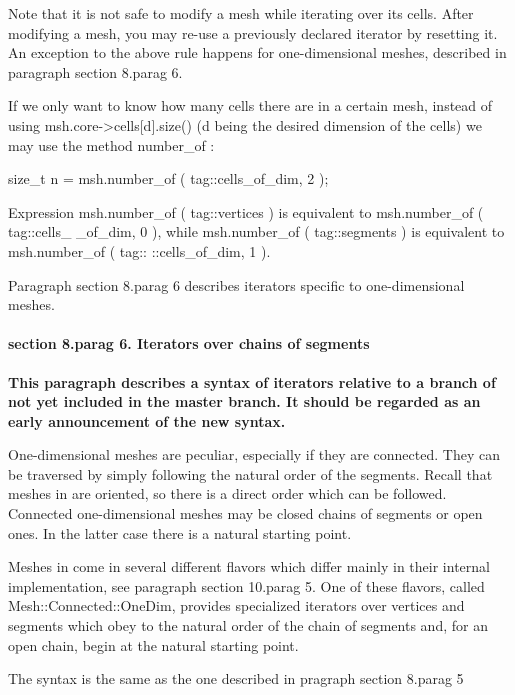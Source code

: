 Note that it is not safe to modify a mesh while iterating over its cells.
After modifying a mesh, you may re-use a previously declared iterator by {\codett reset}ting it.
An exception to the above rule happens for one-dimensional meshes, described in paragraph
\numb section 8.\numb parag 6.

If we only want to know how many cells there are in a certain mesh,
instead of using {\codett msh.core->cells[d].size()} ({\codett d} being the desired
dimension of the cells) we may use the method {\codett number\_of} :

\verbatim
   size_t n = msh.number_of ( tag::cells_of_dim, 2 );
\endverbatim

\noindent Expression {\codett msh.number\_of ( tag::vertices )} is equivalent to
{\codett msh.number\_of ( tag::cells\_ \_of\_dim, 0 )}, while {\codett msh.number\_of
( tag::segments ) } is equivalent to {\codett msh.number\_of ( tag:: ::cells\_of\_dim, 1 )}.

Paragraph \numb section 8.\numb parag 6 describes iterators specific to one-dimensional
meshes.


\paragraph{\numb section 8.\numb parag 6. Iterators over chains of segments}

{\bf This paragraph describes a syntax of iterators relative to a branch of
{\maniFEM} not yet included in the {\codett master} branch.
It should be regarded as an early announcement of the new syntax.}

One-dimensional meshes are peculiar, especially if they are connected.
They can be traversed by simply following the natural order of the segments.
Recall that meshes in {\maniFEM} are oriented, so there is a direct order which can be followed.
Connected one-dimensional meshes may be closed chains of segments or open ones.
In the latter case there is a natural starting point.

Meshes in {\maniFEM} come in several different flavors which differ mainly in their internal
implementation, see paragraph \numb section 10.\numb parag 5.
One of these flavors, called {\codett Mesh::Connected::OneDim}, provides specialized iterators
over vertices and segments which obey to the natural order of the chain of segments and,
for an open chain, begin at the natural starting point.

The syntax is the same as the one described in pragraph \numb section 8.\numb parag 5

